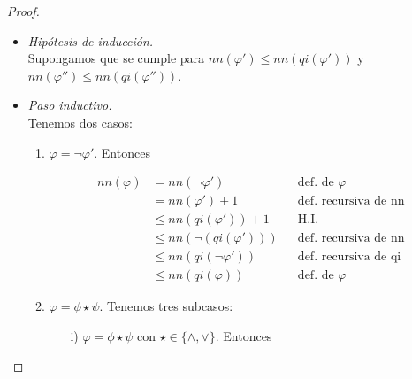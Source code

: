 \documentclass[letterpaper,12pt]{article}
\begin{document}
\begin{enumerate}
\begin{enumerate}
\begin{proof}
\begin{itemize}
                \item \textit{Hipótesis de inducción.} \\
                Supongamos que se cumple para $nn(\varphi ') \leq nn(qi(\varphi '))$
                y $nn(\varphi '') \leq nn(qi(\varphi ''))$.

                \newpage
                \item \textit{Paso inductivo.} \\
                Tenemos dos casos:
                
                \begin{enumerate}
                    \item $\varphi = \neg \varphi '$. Entonces 
                    
                    \begin{align*}
                        nn(\varphi) &= nn(\neg \varphi ')
                        && \text{def. de $\varphi$} \\
                        &= nn(\varphi ') + 1
                        && \text{def. recursiva de nn} \\
                        &\leq nn(qi(\varphi ')) + 1
                        && \text{H.I.} \\
                        &\leq nn(\neg (qi(\varphi '))) 
                        && \text{def. recursiva de nn} \\
                        &\leq nn(qi(\neg \varphi '))
                        && \text{def. recursiva de qi} \\
                        &\leq nn(qi(\varphi))
                        && \text{def. de $\varphi$}
                    \end{align*}
                    
                    \item $\varphi = \phi \star \psi$. Tenemos tres subcasos:
                    
                    \begin{itemize}
                        \item[i)] $\varphi = \phi \star \psi$ con 
                        $\star \in \{\land, \lor \}$. Entonces 
                        

\end{itemize}
\end{enumerate}
\end{itemize}
\end{proof}
\end{enumerate}
\end{enumerate}
\end{document}
